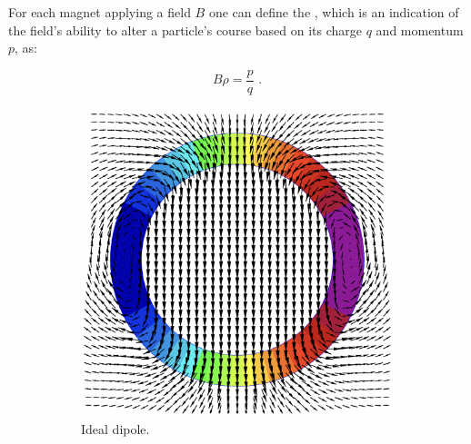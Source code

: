 For each magnet applying a field \(B\) one can define the , which is an indication of the field's ability to alter a particle's course based on its charge \(q\) and momentum \(p\), as:

\begin{equation}
    B \rho = \frac{p}{q} \text{ .}
    \label{equation:magnetic_rigidity}
\end{equation}

\begin{figure}[!hbt]
    \begin{center}
    \begin{subfigure}[b]{0.45\textwidth}
        \begin{center}
        \includegraphics[width=\textwidth]{Figures/Beam_Dynamics_Theory/ideal_dipole_cos_theta.png}
        \caption{Ideal dipole.}
        \label{fig:ideal_dipole}
        \end{center}
    \end{subfigure}
    \hfill
    \begin{subfigure}[b]{0.45\textwidth}
        \begin{center}

\end{center}
\end{subfigure}
\end{center}
\end{figure}
